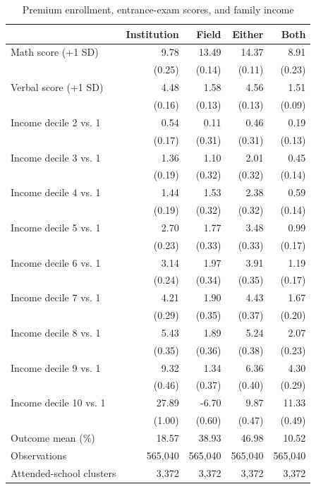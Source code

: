 \begin{table}[!htbp]\centering
\caption{Premium enrollment, entrance-exam scores, and family income}
\label{tab:premium-scores-income}
\small
\begin{tabular}{lrrrr}\hline\hline
 & Institution & Field & Either & Both \\ \hline
Math score (+1 SD) & 9.78 & 13.49 & 14.37 & 8.91 \\
 & (0.25) & (0.14) & (0.11) & (0.23) \\
Verbal score (+1 SD) & 4.48 & 1.58 & 4.56 & 1.51 \\
 & (0.16) & (0.13) & (0.13) & (0.09) \\
Income decile 2 vs. 1 & 0.54 & 0.11 & 0.46 & 0.19 \\
 & (0.17) & (0.31) & (0.31) & (0.13) \\
Income decile 3 vs. 1 & 1.36 & 1.10 & 2.01 & 0.45 \\
 & (0.19) & (0.32) & (0.32) & (0.14) \\
Income decile 4 vs. 1 & 1.44 & 1.53 & 2.38 & 0.59 \\
 & (0.19) & (0.32) & (0.32) & (0.14) \\
Income decile 5 vs. 1 & 2.70 & 1.77 & 3.48 & 0.99 \\
 & (0.23) & (0.33) & (0.33) & (0.17) \\
Income decile 6 vs. 1 & 3.14 & 1.97 & 3.91 & 1.19 \\
 & (0.24) & (0.34) & (0.35) & (0.17) \\
Income decile 7 vs. 1 & 4.21 & 1.90 & 4.43 & 1.67 \\
 & (0.29) & (0.35) & (0.37) & (0.20) \\
Income decile 8 vs. 1 & 5.43 & 1.89 & 5.24 & 2.07 \\
 & (0.35) & (0.36) & (0.38) & (0.23) \\
Income decile 9 vs. 1 & 9.32 & 1.34 & 6.36 & 4.30 \\
 & (0.46) & (0.37) & (0.40) & (0.29) \\
Income decile 10 vs. 1 & 27.89 & -6.70 & 9.87 & 11.33 \\
 & (1.00) & (0.60) & (0.47) & (0.49) \\
\hline
Outcome mean (\%) & 18.57 & 38.93 & 46.98 & 10.52 \\
Observations & 565,040 & 565,040 & 565,040 & 565,040 \\
Attended-school clusters & 3,372 & 3,372 & 3,372 & 3,372 \\

\end{tabular}
\end{table}
